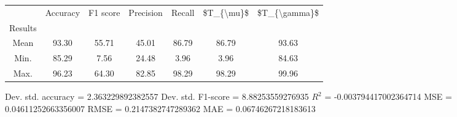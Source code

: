\begin{tabular}{|c|c|c|c|c|c|c|}
\toprule
{} &  Accuracy &  F1 score &  Precision &  Recall &  \$T\_\{\textbackslash mu\}\$ &  \$T\_\{\textbackslash gamma\}\$ \\
Results &           &           &            &         &            &               \\
\hline
Mean    &     93.30 &     55.71 &      45.01 &   86.79 &      86.79 &         93.63 \\
Min.    &     85.29 &      7.56 &      24.48 &    3.96 &       3.96 &         84.63 \\
Max.    &     96.23 &     64.30 &      82.85 &   98.29 &      98.29 &         99.96 \\
\bottomrule
\end{tabular}

 Dev. std. accuracy = 2.363229892382557
 Dev. std. F1-score = 8.88253559276935
 $R^2$ = -0.003794417002364714
 MSE = 0.04611252663356007
 RMSE = 0.2147382747289362
 MAE = 0.06746267218183613